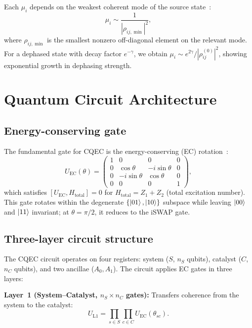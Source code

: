 \documentclass[prx,twocolumn,superscriptaddress,longbibliography,floatfix]{revtex4-2}
\begin{document}
Each $\mu_i$ depends on the weakest coherent mode of the source state~\cite{Shiraishi2024}:
\begin{equation}
\mu_i \sim \frac{1}{|\rho_{ij,\min}|^2},
\label{eq:copy_scaling}
\end{equation}
where $\rho_{ij,\min}$ is the smallest nonzero off-diagonal element on the relevant mode.
For a dephased state with decay factor $e^{-\gamma}$, we obtain $\mu_i \sim e^{2\gamma} / |\rho_{ij}^{(0)}|^2$, showing exponential growth in dephasing strength.


\section{Quantum Circuit Architecture}
\label{sec:circuit}

\subsection{Energy-conserving gate}
\label{sec:ec_gate}

The fundamental gate for CQEC is the energy-conserving (EC) rotation~\cite{Schuch2004,Shiraishi2024}:
\begin{equation}
U_\mathrm{EC}(\theta) = \begin{pmatrix}
1 & 0 & 0 & 0 \\
0 & \cos\theta & -i\sin\theta & 0 \\
0 & -i\sin\theta & \cos\theta & 0 \\
0 & 0 & 0 & 1
\end{pmatrix},
\label{eq:ec_gate_matrix}
\end{equation}
which satisfies $[U_\mathrm{EC}, H_\mathrm{total}] = 0$ for $H_\mathrm{total} = Z_1 + Z_2$ (total excitation number).
This gate rotates within the degenerate $\{\ket{01}, \ket{10}\}$ subspace while leaving $\ket{00}$ and $\ket{11}$ invariant; at $\theta = \pi/2$, it reduces to the iSWAP gate.


\subsection{Three-layer circuit structure}
\label{sec:three_layer}

The CQEC circuit operates on four registers: system ($S$, $n_S$ qubits), catalyst ($C$, $n_C$ qubits), and two ancillae ($A_0, A_1$).
The circuit applies EC gates in three layers:

\textbf{Layer~1 (System--Catalyst, $n_S \times n_C$ gates):}
Transfers coherence from the system to the catalyst:
\begin{equation}
U_\mathrm{L1} = \prod_{s \in S} \prod_{c \in C} U_\mathrm{EC}(\theta_{sc}).
\label{eq:layer1}
\end{equation}
\end{document}
